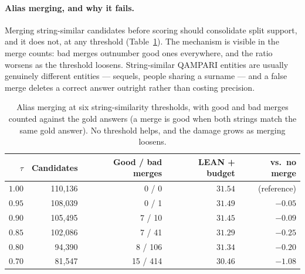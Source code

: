 \documentclass[11pt]{article}
\begin{document}
\paragraph{Alias merging, and why it fails.}
Merging string-similar candidates before scoring should consolidate split support, and it does not, at any threshold (Table~\ref{tab:alias}). The mechanism is visible in the merge counts: bad merges outnumber good ones everywhere, and the ratio worsens as the threshold loosens. String-similar QAMPARI entities are usually genuinely different entities --- sequels, people sharing a surname --- and a false merge deletes a correct answer outright rather than costing precision.

\begin{table}[t]
  \caption{Alias merging at six string-similarity thresholds, with good and bad merges counted against the gold answers (a merge is good when both strings match the same gold answer). No threshold helps, and the damage grows as merging loosens.}
  \label{tab:alias}
  \centering
  \begin{tabular}{rrrrr}
    \toprule
    $\tau$ & Candidates & Good / bad merges & LEAN + budget & vs.\ no merge \\
    \midrule
    $1.00$ & 110,136 & 0 / 0     & $31.54$ & (reference) \\
    $0.95$ & 108,039 & 0 / 1     & $31.49$ & $-0.05$ \\
    $0.90$ & 105,495 & 7 / 10    & $31.45$ & $-0.09$ \\
    $0.85$ & 102,086 & 7 / 41    & $31.29$ & $-0.25$ \\
    $0.80$ &  94,390 & 8 / 106   & $31.34$ & $-0.20$ \\
    $0.70$ &  81,547 & 15 / 414  & $30.46$ & $-1.08$ \\
    \bottomrule
  \end{tabular}
\end{table}
\end{document}
